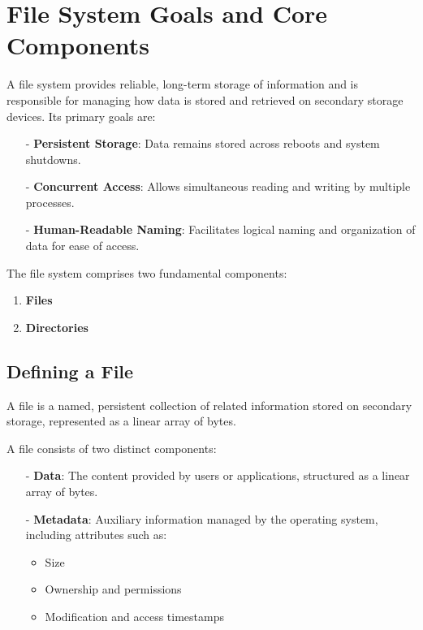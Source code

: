 \documentclass[../../compsys.tex]{subfiles}
\begin{document}
\section{File System Goals and Core Components}
A file system provides reliable, long-term storage of information and is responsible for managing how data is stored and retrieved on secondary storage devices. Its primary goals are:

\begin{itemize}
    \item[-] \textbf{Persistent Storage}: Data remains stored across reboots and system shutdowns.
    \item[-] \textbf{Concurrent Access}: Allows simultaneous reading and writing by multiple processes.
    \item[-] \textbf{Human-Readable Naming}: Facilitates logical naming and organization of data for ease of access.
\end{itemize}

The file system comprises two fundamental components:
\begin{enumerate}
    \item \textbf{Files}
    \item \textbf{Directories}
\end{enumerate}

\subsection{Defining a File}

\begin{definition}[File]
A file is a named, persistent collection of related information stored on secondary storage, represented as a linear array of bytes.
\end{definition}

A file consists of two distinct components:

\begin{itemize}
  \item[-] \textbf{Data}: The content provided by users or applications, structured as a linear array of bytes.
  \item[-] \textbf{Metadata}: Auxiliary information managed by the operating system, including attributes such as:
    \begin{itemize}
        \item Size
        \item Ownership and permissions
        \item Modification and access timestamps
    \end{itemize}
\end{itemize}
\end{document}
